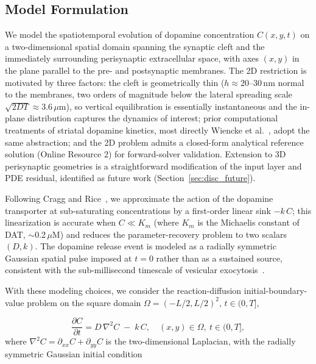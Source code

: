 \documentclass[12pt]{article}
\begin{document}
\subsection{Model Formulation}
\label{sec:math}

We model the spatiotemporal evolution of dopamine concentration
$C(x, y, t)$ on a two-dimensional spatial domain spanning the
synaptic cleft and the immediately surrounding perisynaptic
extracellular space, with axes $(x, y)$ in the plane parallel
to the pre- and postsynaptic membranes. The 2D restriction is
motivated by three factors: the cleft is geometrically thin
($h \approx 20$--$30\,\text{nm}$ normal to the membranes, two
orders of magnitude below the lateral spreading scale
$\sqrt{2DT} \approx 3.6\,\mu\text{m}$), so vertical equilibration
is essentially instantaneous and the in-plane distribution
captures the dynamics of interest; prior computational treatments
of striatal dopamine kinetics, most directly Wiencke et
al.~\cite{Wiencke2020}, adopt the same abstraction; and the 2D
problem admits a closed-form analytical reference solution
(Online Resource 2) for forward-solver validation. Extension to
3D perisynaptic geometries is a straightforward modification of
the input layer and PDE residual, identified as future work
(Section~\ref{sec:disc_future}).

Following Cragg
and Rice~\cite{CraggRice2004}, we approximate the action of
the dopamine transporter at sub-saturating concentrations by a
first-order linear sink $-k\,C$; this linearization is accurate
when $C \ll K_m$ (where $K_m$ is the Michaelis constant of DAT,
$\sim$0.2\,$\mu$M) and reduces the parameter-recovery problem
to two scalars $(D, k)$. The dopamine release event is modeled
as a radially symmetric Gaussian spatial pulse imposed at
$t = 0$ rather than as a sustained source, consistent with the
sub-millisecond timescale of vesicular
exocytosis~\cite{Wiencke2020}.

With these modeling choices, we consider the reaction-diffusion
initial-boundary-value problem on the square domain
$\Omega = (-L/2, L/2)^2$, $t \in (0, T]$,

\begin{equation}
  \frac{\partial C}{\partial t} = D\,\nabla^2 C \;-\; k\,C,
  \quad (x, y) \in \Omega,\ t \in (0, T],
  \label{eq:pde}
\end{equation}
where $\nabla^2 C = \partial_{xx} C + \partial_{yy} C$ is the
two-dimensional Laplacian, with the radially symmetric Gaussian
initial condition
\end{document}
